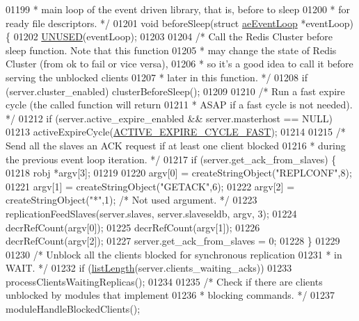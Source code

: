 \begin{DoxyCode}
{{{{{{{{{{{{01199 \textcolor{comment}{ * main loop of the event driven library, that is, before to sleep}
01200 \textcolor{comment}{ * for ready file descriptors. */}
01201 \textcolor{keywordtype}{void} beforeSleep(\textcolor{keyword}{struct} \hyperlink{structaeEventLoop}{aeEventLoop} *eventLoop) \{
01202     \hyperlink{server_8h_ae7c9dc8f13568a9c856573751f1ee1ec}{UNUSED}(eventLoop);
01203 
01204     \textcolor{comment}{/* Call the Redis Cluster before sleep function. Note that this function}
01205 \textcolor{comment}{     * may change the state of Redis Cluster (from ok to fail or vice versa),}
01206 \textcolor{comment}{     * so it's a good idea to call it before serving the unblocked clients}
01207 \textcolor{comment}{     * later in this function. */}
01208     \textcolor{keywordflow}{if} (server.cluster\_enabled) clusterBeforeSleep();
01209 
01210     \textcolor{comment}{/* Run a fast expire cycle (the called function will return}
01211 \textcolor{comment}{     * ASAP if a fast cycle is not needed). */}
01212     \textcolor{keywordflow}{if} (server.active\_expire\_enabled && server.masterhost == NULL)
01213         activeExpireCycle(\hyperlink{server_8h_ae265e849da28d7e7793659e45579ee11}{ACTIVE\_EXPIRE\_CYCLE\_FAST});
01214 
01215     \textcolor{comment}{/* Send all the slaves an ACK request if at least one client blocked}
01216 \textcolor{comment}{     * during the previous event loop iteration. */}
01217     \textcolor{keywordflow}{if} (server.get\_ack\_from\_slaves) \{
01218         robj *argv[3];
01219 
01220         argv[0] = createStringObject(\textcolor{stringliteral}{"REPLCONF"},8);
01221         argv[1] = createStringObject(\textcolor{stringliteral}{"GETACK"},6);
01222         argv[2] = createStringObject(\textcolor{stringliteral}{"*"},1); \textcolor{comment}{/* Not used argument. */}
01223         replicationFeedSlaves(server.slaves, server.slaveseldb, argv, 3);
01224         decrRefCount(argv[0]);
01225         decrRefCount(argv[1]);
01226         decrRefCount(argv[2]);
01227         server.get\_ack\_from\_slaves = 0;
01228     \}
01229 
01230     \textcolor{comment}{/* Unblock all the clients blocked for synchronous replication}
01231 \textcolor{comment}{     * in WAIT. */}
01232     \textcolor{keywordflow}{if} (\hyperlink{adlist_8h_afde0ab079f934670e82119b43120e94b}{listLength}(server.clients\_waiting\_acks))
01233         processClientsWaitingReplicas();
01234 
01235     \textcolor{comment}{/* Check if there are clients unblocked by modules that implement}
01236 \textcolor{comment}{     * blocking commands. */}
01237     moduleHandleBlockedClients();
}}}}}}}}}}}}
\end{DoxyCode}
